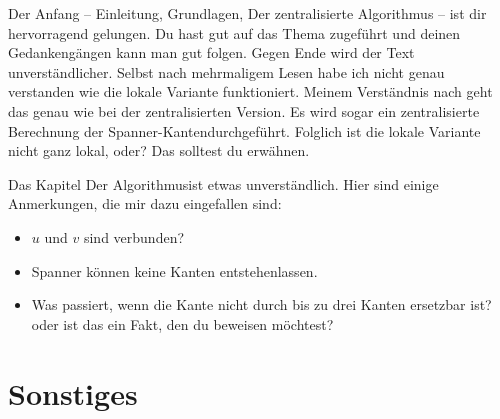 \documentclass[a4paper,twoside]{IEEEtran}
\begin{document}
Der Anfang -- Einleitung, Grundlagen, Der zentralisierte Algorithmus -- ist dir hervorragend gelungen.
Du hast gut auf das Thema zugeführt und deinen Gedankengängen kann man gut folgen.
Gegen Ende wird der Text unverständlicher. 
Selbst nach mehrmaligem Lesen habe ich nicht genau verstanden wie die lokale Variante funktioniert.
Meinem Verständnis nach geht das genau wie bei der zentralisierten Version.
Es wird sogar ein \glqq zentralisierte Berechnung der Spanner-Kanten\grqq durchgeführt.
Folglich ist die lokale Variante nicht ganz lokal, oder?
Das solltest du erwähnen.

Das Kapitel \glqq Der Algorithmus\grqq ist etwas unverständlich. 
Hier sind einige Anmerkungen, die mir dazu eingefallen sind:
\begin{itemize}
\item $u $ und $v $ sind verbunden?
\item Spanner können keine Kanten  \glqq entstehen\grqq lassen.
\item Was passiert, wenn die Kante nicht \glqq durch bis zu drei Kanten ersetzbar ist?\grqq oder ist das ein Fakt, den du beweisen möchtest?

\end{itemize}





\section{Sonstiges}
\end{document}
